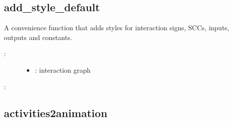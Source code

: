 \documentclass[letterpaper,10pt,english]{sphinxmanual}
\begin{document}
\subsection{add\_style\_default}
\label{\detokenize{InteractionGraphs:add-style-default}}\label{\detokenize{InteractionGraphs:id17}}

\begin{fulllineitems}
\label{\detokenize{InteractionGraphs:PyBoolNet.InteractionGraphs.add_style_default}}
A convenience function that adds styles for interaction signs, SCCs, inputs, outputs and constants.
\begin{description}
\item[{:}] \leavevmode\begin{itemize}
\item {} 
: interaction graph

\end{itemize}

\end{description}

:

\begin{sphinxVerbatim}[commandchars=\\\{\}]
 
\end{sphinxVerbatim}

\end{fulllineitems}



\subsection{activities2animation}
\label{\detokenize{InteractionGraphs:id18}}\label{\detokenize{InteractionGraphs:activities2animation}}
\end{document}
